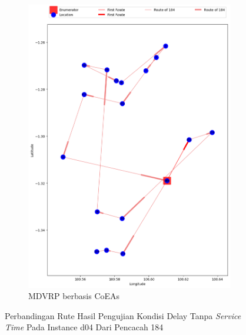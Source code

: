 \begin{figure}[H]
	\centering
	\begin{subfigure}[t]{\textwidth}
		\centering
		\includegraphics[width=\textwidth]{Resources/Images/delayed_5/real_m15_n100_delayed_5_184_coes}
		\caption{MDVRP berbasis CoEAs}
		\label{fig:real_m15_n100_delayed_5_184_coes}
	\end{subfigure}
	\caption{Perbandingan Rute Hasil Pengujian Kondisi Delay Tanpa \textit{Service Time} Pada Instance d04 Dari Pencacah 184}
	\label{fig:real_m15_n100_delayed_5_184}
\end{figure}


